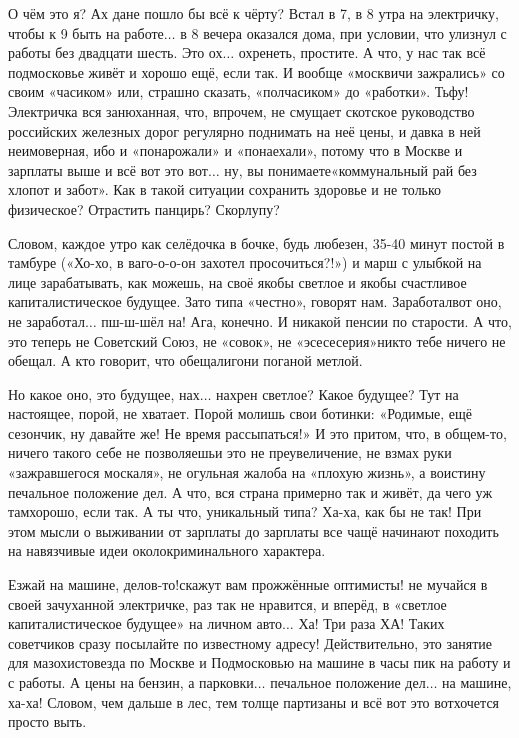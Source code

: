 О чём это я? Ах да\mdash не пошло бы всё к чёрту? Встал в 7, в 8 утра на электричку, чтобы к 9 быть на работе$\ldots$ в 8 вечера оказался дома, при условии, что улизнул с работы без двадцати шесть. Это ох$\ldots$ охренеть, простите. А что, у нас так всё подмосковье живёт и хорошо ещё, если так. И вообще «москвичи зажрались» со своим «часиком» или, страшно сказать, «полчасиком» до «работки». Тьфу! Электричка вся занюханная, что, впрочем, не смущает скотское руководство российских железных дорог регулярно поднимать на неё цены, и давка в ней неимоверная, ибо и «понарожали» и «понаехали», потому что в Москве и зарплаты выше и всё вот это вот$\ldots$ ну, вы понимаете\mdash «коммунальный рай без хлопот и забот». Как в такой ситуации сохранить здоровье и не только физическое? Отрастить панцирь? Скорлупу?

Словом, каждое утро как селёдочка в бочке, будь любезен, 35-40 минут постой в тамбуре («Хо-хо, в ваго-о-о-он захотел просочиться?!») и марш с улыбкой на лице зарабатывать, как можешь, на своё якобы светлое и якобы счастливое капиталистическое будущее. Зато типа «честно», говорят нам. Заработал\mdash вот оно, не заработал$\ldots$ пш-ш-шёл на! Ага, конечно. И никакой пенсии по старости. А что, это теперь не Советский Союз, не «совок», не «эсесесерия»\mdash никто тебе ничего не обещал. А кто говорит, что обещали\mdash гони поганой метлой.

Но какое оно, это будущее, нах$\ldots$ нахрен светлое? Какое будущее? Тут на настоящее, порой, не хватает. Порой молишь свои ботинки: «Родимые, ещё сезончик, ну давайте же! Не время рассыпаться!» И это притом, что, в общем-то, ничего такого себе не позволяешь\mdash и это не преувеличение, не взмах руки «зажравшегося москаля», не огульная жалоба на «плохую жизнь», а воистину печальное положение дел. А что, вся страна примерно так и живёт, да чего уж там\mdash хорошо, если так. А ты что, уникальный типа? Ха-ха, как бы не так! При этом мысли о выживании от зарплаты до зарплаты все чащё начинают походить на навязчивые идеи околокриминального характера.

\mdash Езжай на машине, делов-то!\mdash скажут вам прожжённые оптимисты! \mdash не мучайся в своей зачуханной электричке, раз так не нравится, и вперёд, в «светлое капиталистическое будущее» на личном авто$\ldots$ Ха! Три раза ХА! Таких советчиков сразу посылайте по известному адресу! Действительно, это занятие для мазохистов\mdash езда по Москве и Подмосковью на машине в часы пик на работу и с работы. А цены на бензин, а парковки$\ldots$ печальное положение дел$\ldots$ на машине, ха-ха! Словом, чем дальше в лес, тем толще партизаны и всё вот это вот\mdash хочется просто выть.

